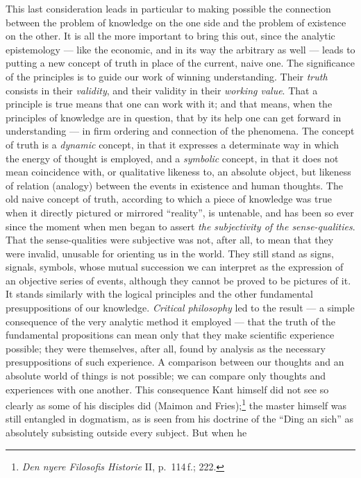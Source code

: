 \documentclass[12pt,a4paper]{book}
\newcommand{\opage}[1]{\marginnote{\footnotesize\textit{[#1]}}}
\begin{document}
This last consideration leads in particular to making possible the connection
between the problem of knowledge on the one side and the problem of existence on
the other. It is all the more important to bring this out, since the analytic
epistemology --- like the economic, and in its way the arbitrary as well ---
leads to putting a new concept of truth in place of the current, naive one. The
significance of the principles is to guide our work of winning understanding.
Their \emph{truth} consists in their \emph{validity}, and their validity in
their \emph{working value}. That a principle is true means that one can work
with it; and that means, when the principles of knowledge are in question, that
by its help one can get forward in understanding --- in firm ordering and
connection of the phenomena. The concept of truth is a \emph{dynamic} concept,
in that it expresses a determinate way in which the energy of thought is
employed, and a \emph{symbolic} concept, in that it does not mean coincidence
with, or qualitative likeness to, an absolute object, but likeness of relation
(analogy) between the events in existence and human thoughts. The old naive
concept of truth, according to which a piece of knowledge was true when it
directly pictured or mirrored ``reality'', is untenable, and has been so ever
since the moment when men began to assert \emph{the subjectivity of the
sense-qualities}. That the sense-qualities were subjective was not, after all,
to mean that they were invalid, unusable for orienting us in the world. They
still stand as signs, signals, symbols, whose mutual succession we can interpret
as the expression of an objective series of events, although they cannot be
proved to be pictures of it. It stands similarly with the logical principles and
the other \opage{38}fundamental presuppositions of our knowledge. \emph{Critical
philosophy} led to the result --- a simple consequence of the very analytic
method it employed --- that the truth of the fundamental propositions can mean
only that they make scientific experience possible; they were themselves, after
all, found by analysis as the necessary presuppositions of such experience. A
comparison between our thoughts and an absolute world of things is not possible;
we can compare only thoughts and experiences with one another. This consequence
Kant himself did not see so clearly as some of his disciples did (Maimon and
Fries);\footnote{\textit{Den nyere Filosofis Historie} II, p.~114\,f.; 222.} the
master himself was still entangled in dogmatism, as is seen from his doctrine of
the ``Ding an sich'' as absolutely subsisting outside every subject. But when he
\end{document}
